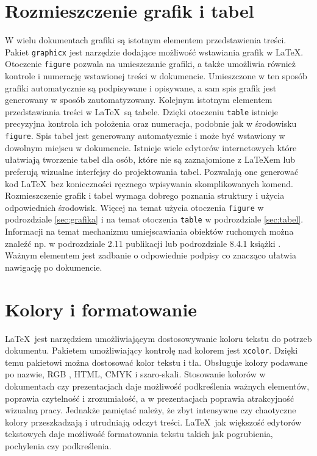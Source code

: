 \section{Rozmieszczenie grafik i tabel}
W wielu dokumentach grafiki są istotnym elementem przedstawienia treści. Pakiet \texttt{graphicx} jest narzędzie dodające możliwość wstawiania grafik w \LaTeX. Otoczenie  \texttt{figure} pozwala na umieszczanie grafiki, a także umożliwia również kontrole i numerację wstawionej treści w dokumencie. Umieszczone w ten sposób grafiki automatycznie są podpisywane i opisywane, a sam spis grafik jest generowany w sposób zautomatyzowany. Kolejnym istotnym elementem przedstawiania treści w \LaTeX\ są tabele. Dzięki otoczeniu \texttt{table} istnieje precyzyjna kontrola ich położenia oraz numeracja, podobnie jak w środowisku \texttt{figure}. Spis tabel jest generowany automatycznie i może być wstawiony w dowolnym miejscu w dokumencie. Istnieje wiele edytorów internetowych które ułatwiają tworzenie tabel dla osób, które nie są zaznajomione z \LaTeX{em} lub preferują wizualne interfejsy do projektowania tabel. Pozwalają one generować kod \LaTeX\ bez konieczności ręcznego wpisywania skomplikowanych komend. Rozmieszczenie grafik i tabel wymaga dobrego poznania struktury i użycia odpowiednich środowisk. Więcej na temat użycia otoczenia \texttt{figure} w podrozdziale \ref{sec:grafika} i na temat otoczenia \texttt{table} w podrozdziale \ref{sec:tabel}. Informacji na temat mechanizmu umiejscawiania obiektów ruchomych można znaleźć np. w podrozdziale 2.11 publikacji \cite{oetiker2022nie} lub podrozdziale 8.4.1 książki \cite{kucharczyk1994wprowadzenie}. Ważnym elementem jest zadbanie o odpowiednie podpisy co znacząco ułatwia nawigację po dokumencie. 

\section{Kolory i formatowanie}
\LaTeX\ jest narzędziem umożliwiającym dostosowywanie koloru tekstu do potrzeb dokumentu. Pakietem umożliwiający kontrolę nad kolorem jest \texttt{xcolor}. Dzięki temu pakietowi można dostosować kolor tekstu i tła. Obsługuje kolory podawane po nazwie, RGB , HTML, CMYK i szaro-skali. Stosowanie kolorów w dokumentach czy prezentacjach daje możliwość podkreślenia ważnych elementów, poprawia czytelność i zrozumiałość,  a w prezentacjach poprawia atrakcyjność wizualną pracy. Jednakże pamiętać należy, że zbyt intensywne czy chaotyczne kolory przeszkadzają i utrudniają odczyt treści. \LaTeX\ jak większość edytorów tekstowych daje możliwość formatowania tekstu takich jak pogrubienia, pochylenia czy podkreślenia. 

